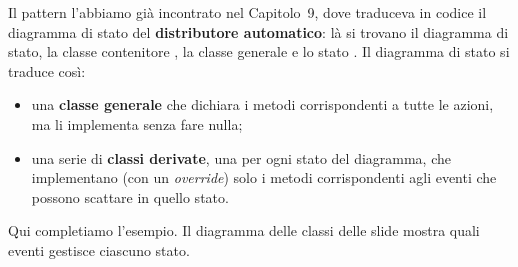 \medskip
Il pattern l'abbiamo già incontrato nel Capitolo~9, dove traduceva in codice il diagramma di stato del
\textbf{distributore automatico}: là si trovano il diagramma di stato, la classe contenitore , la classe
generale  e lo stato . Il diagramma di stato si traduce così:
\begin{itemize}
  \item una \textbf{classe generale} che dichiara i metodi corrispondenti a tutte le azioni, ma li implementa senza fare
        nulla;
  \item una serie di \textbf{classi derivate}, una per ogni stato del diagramma, che implementano (con un
        \textit{override}) solo i metodi corrispondenti agli eventi che possono scattare in quello stato.
\end{itemize}
Qui completiamo l'esempio. Il diagramma delle classi delle slide mostra quali eventi gestisce ciascuno stato.

